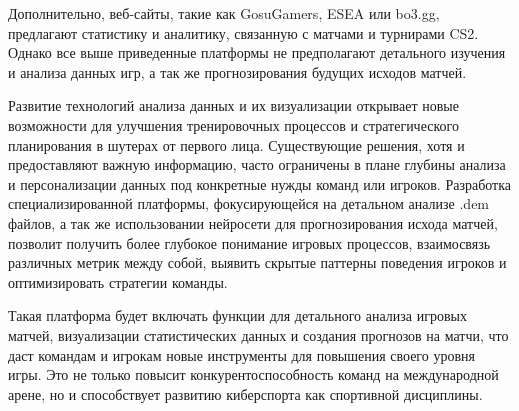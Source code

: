 Дополнительно, веб-сайты, такие как GosuGamers, ESEA или bo3.gg, предлагают статистику и аналитику, связанную с матчами и турнирами CS2. Однако все выше приведенные платформы не предполагают детального изучения и анализа данных игр, а так же прогнозирования будущих исходов матчей.

Развитие технологий анализа данных и их визуализации открывает новые возможности для улучшения тренировочных процессов и стратегического планирования в шутерах от первого лица. Существующие решения, хотя и предоставляют важную информацию, часто ограничены в плане глубины анализа и персонализации данных под конкретные нужды команд или игроков. Разработка специализированной платформы, фокусирующейся на детальном анализе .dem файлов, а так же использовании нейросети для прогнозирования исхода матчей, позволит получить более глубокое понимание игровых процессов, взаимосвязь различных метрик между собой, выявить скрытые паттерны поведения игроков и оптимизировать стратегии команды.

Такая платформа будет включать функции для детального анализа игровых матчей, визуализации статистических данных и создания прогнозов на матчи, что даст командам и игрокам новые инструменты для повышения своего уровня игры. Это не только повысит конкурентоспособность команд на международной арене, но и способствует развитию киберспорта как спортивной дисциплины.